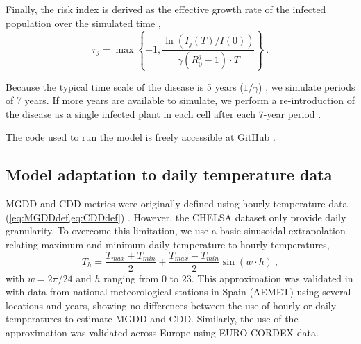 Finally, the risk index is derived as the effective growth rate of the
infected population over the simulated time \cite{GimenezRomero2022_CommsBio},
\begin{equation}
    r_j=\max\left\{-1, \frac{\ln(I_j(T) / I(0))}{\gamma(R_0^j-1)\cdot
        T}\right\} \ .
\end{equation}

Because the typical time scale of the disease is 5 years ($1/\gamma$)
\cite{Almeida2003}, we simulate periods of 7 years. If more years are available
to simulate, we perform a re-introduction of the disease as a single infected
plant in each cell after each 7-year period
\cite{GimenezRomero2022_CommsBio}.

The code used to run the model is freely accessible at GitHub
\cite{CODE_model}.

\subsection{Model adaptation to daily temperature data}

MGDD and CDD metrics were originally defined using hourly temperature data
(\cref{eq:MGDDdef,eq:CDDdef}) \cite{GimenezRomero2022_CommsBio}. However, the
CHELSA
dataset only provide daily granularity. To overcome this limitation, we use a
basic sinusoidal extrapolation relating maximum and minimum daily temperature
to hourly temperatures,
\begin{equation}
    T_h=\frac{T_{max}+T_{min}}{2} + \frac{T_{max}-T_{min}}{2}\sin(w\cdot h)
    \ ,
\end{equation}
with $w=2\pi/24$ and $h$ ranging from $0$ to $23$. This approximation was
validated in \cite{GimenezRomero2023_PD} with data from national meteorological
stations
in Spain (AEMET) using several locations and years, showing no differences
between the use of hourly or daily temperatures to estimate MGDD and CDD.
Similarly, the use of the approximation was validated across Europe using
EURO-CORDEX data.
